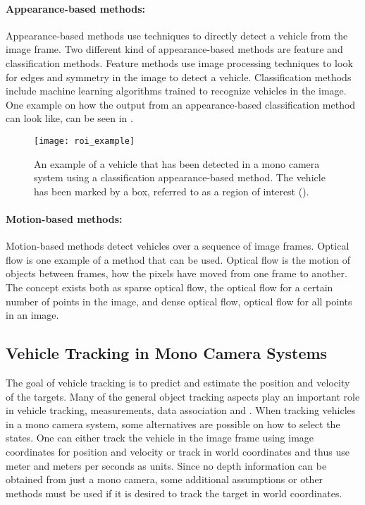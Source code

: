 \paragraph{Appearance-based methods:}
Appearance-based methods use techniques to directly detect a vehicle from the image frame.
Two different kind of appearance-based methods are feature and classification methods.
Feature methods use image processing techniques to look for \eg edges and symmetry in the image to detect a vehicle.
Classification methods include machine learning algorithms trained to recognize vehicles in the image.
One example on how the output from an appearance-based classification method can look like, can be seen in .

\begin{figure}[!ht]
	\centering
	\texttt{[image: roi\_example]}
	\caption{\label{fig:roiexample} An example of a vehicle that has been detected in a mono camera system using a classification appearance-based method. The vehicle has been marked by a box, referred to as a region of interest (\abbrROI).}
\end{figure}

\paragraph{Motion-based methods:}
Motion-based methods detect vehicles over a sequence of image frames.
Optical flow is one example of a method that can be used.
Optical flow is the motion of objects between frames, \ie how the pixels have moved from one frame to another.
The concept exists both as sparse optical flow, \ie the optical flow for a certain number of points in the image, and dense optical flow, \ie optical flow for all points in an image.

\subsection{Vehicle Tracking in Mono Camera Systems}
The goal of vehicle tracking is to predict and estimate \eg the position and velocity of the targets.
Many of the general object tracking aspects play an important role in vehicle tracking, \eg measurements, data association and \abbrMTT.
When tracking vehicles in a mono camera system, some alternatives are possible on how to select the states.
One can either track the vehicle in the image frame using image coordinates for position and velocity or track in  world coordinates and thus use meter and meters per seconds as units.
Since no depth information can be obtained from just a mono camera, some additional assumptions or other methods must be used if it is desired to track the target in  world coordinates.

